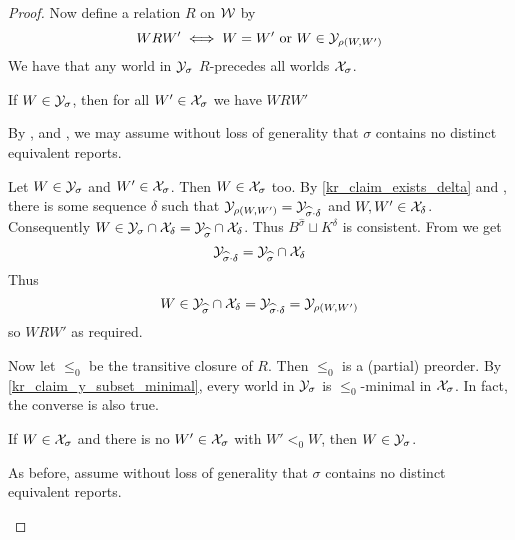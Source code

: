 \begin{proof}
Now define a relation $R$ on $\mathcal{W}$ by
\[
    W R W' \iff W = W' \text{ or } W \in \mathcal{Y}_{\rho(W, W')}
\]
We have that any world in $\mathcal{Y}_\sigma$ $R$-precedes all worlds $\mathcal{X}_\sigma$.

    \begin{claim}
        \label{kr_claim_y_subset_minimal}
        If $W \in \mathcal{Y}_\sigma$, then for all $W' \in \mathcal{X}_\sigma$ we have $W R W'$
    \end{claim}
    \begin{claimproof}
        By \rearr{}, \equivpost{} and
        \duprem{}, we may assume without loss of generality that
        $\sigma$ contains no distinct equivalent reports.

        Let $W \in \mathcal{Y}_\sigma$ and $W' \in \mathcal{X}_\sigma$. Then $W \in \mathcal{X}_\sigma$
        too. By \cref{kr_claim_exists_delta} and \rearr{}, there is
        some sequence $\delta$ such that $\mathcal{Y}_{\rho(W, W')} =
        \mathcal{Y}_{\widehat{\sigma} \cdot \delta}$ and $W, W' \in \mathcal{X}_\delta$.
        Consequently $W \in \mathcal{Y}_\sigma \cap \mathcal{X}_\delta = \mathcal{Y}_{\widehat{\sigma}}
        \cap \mathcal{X}_\delta$. Thus $B^{\widehat{\sigma}} \sqcup K^\delta$ is
        consistent. From \incvac{} we get
        \[
            \mathcal{Y}_{\widehat{\sigma} \cdot \delta} = \mathcal{Y}_{\widehat{\sigma}} \cap
            \mathcal{X}_\delta
        \]
        Thus
        \[
            W \in
            \mathcal{Y}_{\widehat{\sigma}} \cap \mathcal{X}_\delta
            = \mathcal{Y}_{\widehat{\sigma} \cdot \delta}
            = \mathcal{Y}_{\rho(W, W')}
        \]
        so $W R W'$ as required.
    \end{claimproof}

Now let $\le_0$ be the transitive closure of $R$. Then $\le_0$ is a (partial)
preorder. By \cref{kr_claim_y_subset_minimal}, every world in $\mathcal{Y}_\sigma$ is
$\le_0$-minimal in $\mathcal{X}_\sigma$. In fact, the converse is also true.

    \begin{claim}
        \label{kr_claim_minimal_subset_y}
        If $W \in \mathcal{X}_\sigma$ and there is no $W' \in \mathcal{X}_\sigma$ with $W' <_0
        W$, then $W \in \mathcal{Y}_\sigma$.
    \end{claim}
    \begin{claimproof}
        As before, assume without loss of generality that
        $\sigma$ contains no distinct equivalent reports.


\end{claimproof}
\end{proof}
